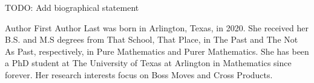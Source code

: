 
TODO: Add biographical statement

{Author First Author Last} was born in Arlington, Texas, in 2020. She received
her B.S. and M.S degrees from That School, That Place, 
in The Past and The Not As Past, respectively, in Pure Mathematics and Purer Mathematics. She has been a PhD student at The University of Texas at Arlington in Mathematics since forever. Her research interests focus on Boss Moves and Cross Products.
